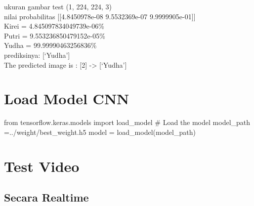 \documentclass[
  letterpaper,
  DIV=11,
  numbers=noendperiod]{scrreprt}
\newenvironment{Shaded}{\begin{snugshade}}{\end{snugshade}}
\newcommand{\CommentTok}[1]{\textcolor[rgb]{0.37,0.37,0.37}{#1}}
\newcommand{\ImportTok}[1]{\textcolor[rgb]{0.00,0.46,0.62}{#1}}
\newcommand{\NormalTok}[1]{\textcolor[rgb]{0.00,0.23,0.31}{#1}}
\newcommand{\OperatorTok}[1]{\textcolor[rgb]{0.37,0.37,0.37}{#1}}
\newcommand{\StringTok}[1]{\textcolor[rgb]{0.13,0.47,0.30}{#1}}
\begin{document}
ukuran gambar test (1, 224, 224, 3)\\
nilai probabilitas {[}{[}4.8450978e-08 9.5532369e-07
9.9999905e-01{]}{]}\\
Kirei = 4.845097834049739e-06\%\\
Putri = 9.553236850479152e-05\%\\
Yudha = 99.99990463256836\%\\
prediksinya: {[}`Yudha'{]}\\
The predicted image is : {[}2{]} -\textgreater{} {[}`Yudha'{]}

\hypertarget{load-model-cnn}{%
\section*{Load Model CNN}\label{load-model-cnn}}


\begin{Shaded}
\begin{Highlighting}[]
\ImportTok{from}\NormalTok{ tensorflow.keras.models }\ImportTok{import}\NormalTok{ load\_model}
\CommentTok{\# Load the model}
\NormalTok{model\_path }\OperatorTok{=}\StringTok{\textquotesingle{}../weight/best\_weight.h5\textquotesingle{}}
\NormalTok{model }\OperatorTok{=}\NormalTok{ load\_model(model\_path)}
\end{Highlighting}
\end{Shaded}

\hypertarget{test-video}{%
\section*{Test Video}\label{test-video}}


\hypertarget{secara-realtime}{%
\subsection*{Secara Realtime}\label{secara-realtime}}
\end{document}
